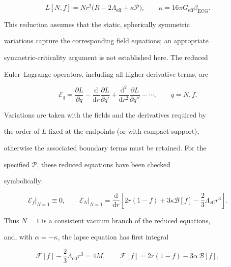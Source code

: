 \[

L[N,f]=N r^2\bigl(R-2\Lambda_{\mathrm{eff}}+\kappa\mathcal P\bigr),

\qquad

\kappa=16\pi G_{\mathrm{eff}}\beta_{\mathrm{ECG}}.

\]

This reduction assumes that the static, spherically symmetric

variations capture the corresponding field equations; an appropriate

symmetric-criticality argument is not established here. The reduced

Euler--Lagrange operators, including all higher-derivative terms, are

\[

\mathcal E_q

=\frac{\partial L}{\partial q}

-\frac{\mathrm d}{\mathrm dr}\frac{\partial L}{\partial q'}

+\frac{\mathrm d^2}{\mathrm dr^2}\frac{\partial L}{\partial q''}

-\cdots,\qquad q=N,f.

\]

Variations are taken with the fields and the derivatives required by

the order of \(L\) fixed at the endpoints (or with compact support);

otherwise the associated boundary terms must be retained. For the

specified \(\mathcal P\), these reduced equations have been checked

symbolically:

\[

\left.\mathcal E_f\right|_{N=1}\equiv0,\qquad

\left.\mathcal E_N\right|_{N=1}

=\frac{\mathrm d}{\mathrm dr}

\left[2r(1-f)+3\kappa\mathcal B[f]

-\frac23\Lambda_{\mathrm{eff}}r^3\right].

\]

Thus \(N=1\) is a consistent vacuum branch of the reduced equations,

and, with \(\alpha=-\kappa\), the lapse equation has first integral

\[

\mathcal F[f]-\frac23\Lambda_{\mathrm{eff}}r^3=4M,\qquad

\mathcal F[f]=2r(1-f)-3\alpha\,\mathcal B[f],

\]

